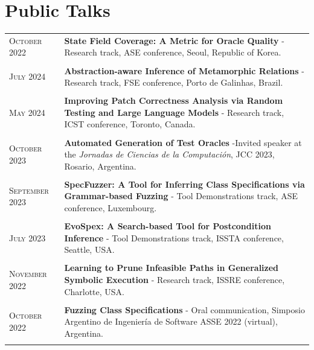 \documentclass[a4paper,10pt]{article} %
\begin{document}
\section{Public Talks}

\begin{longtable}{>{\raggedleft\arraybackslash}p{} p{}}

\textsc{October} 2022 & \textbf{State Field Coverage: A Metric for Oracle Quality} - Research track, ASE conference, Seoul, Republic of Korea. \\ & \\

\textsc{July} 2024 & \textbf{Abstraction-aware Inference of Metamorphic Relations} - Research track, FSE conference, Porto de Galinhas, Brazil. \\ & \\

\textsc{May} 2024  & \textbf{Improving Patch Correctness Analysis via Random Testing and Large Language Models} - Research track, ICST conference, Toronto, Canada. \\ & \\

\textsc{October} 2023 & \textbf{Automated Generation of Test Oracles} -Invited speaker at the \textit{Jornadas de Ciencias de la Computación}, JCC 2023, Rosario, Argentina. \\ & \\

\textsc{September} 2023 & \textbf{SpecFuzzer: A Tool for Inferring Class Specifications via Grammar-based Fuzzing} - Tool Demonstrations track, ASE conference, Luxembourg. \\ & \\

\textsc{July} 2023 & \textbf{EvoSpex: A Search-based Tool for Postcondition Inference} - Tool Demonstrations track, ISSTA conference, Seattle, USA. \\ & \\

\textsc{November} 2022 & \textbf{Learning to Prune Infeasible Paths in Generalized Symbolic Execution} - Research track, ISSRE conference, Charlotte, USA. \\ & \\

\textsc{October} 2022 & \textbf{Fuzzing Class Specifications} - Oral communication, Simposio Argentino de Ingeniería de Software ASSE 2022 (virtual), Argentina. \\ & \\


\end{longtable}
\end{document}
